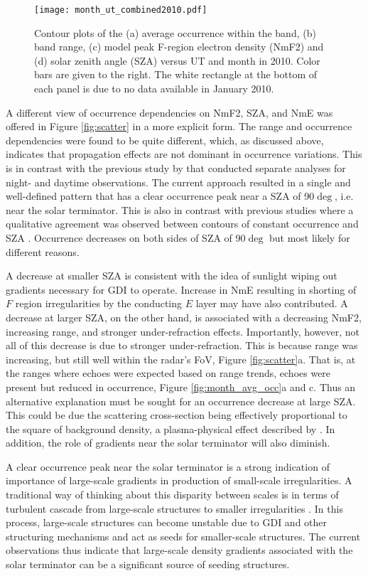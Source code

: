 \begin{figure}
\texttt{[image: month\_ut\_combined2010.pdf]}
\caption{Contour plots of the (a) average occurrence within the band, (b) band range, (c) model peak F-region electron density (NmF2) and (d) solar zenith angle (SZA) versus UT and month in 2010. Color bars are given to the right. The white rectangle at the bottom of each panel is due to no data available in January 2010.}
\label{fig:month_ut}
\end{figure}

A different view of occurrence dependencies on NmF2, SZA, and NmE was offered in Figure \ref{fig:scatter} in a more explicit form. The range and occurrence dependencies were found to be quite different, which, as discussed above, indicates that propagation effects are not dominant in occurrence variations. This is in contrast with the previous study by \citet{Kane2012} that conducted separate analyses for night- and daytime observations. The current approach resulted in a single and well-defined pattern that has a clear occurrence peak near a SZA of 90\(\deg\), i.e. near the solar terminator. This is also in contrast with previous studies where a qualitative agreement was observed between contours of constant occurrence and SZA \citep{Kane12,Ghezelbesh2014b}. Occurrence decreases on both sides of SZA of 90\(\deg\) but most likely for different reasons.

A decrease at smaller SZA is consistent with the idea of sunlight wiping out gradients necessary for GDI to operate. Increase in NmE resulting in shorting of \(F\) region irregularities by the conducting \(E\) layer may have also contributed. A decrease at larger SZA, on the other hand, is associated with a decreasing NmF2, increasing range, and stronger under-refraction effects. Importantly, however, not all of this decrease is due to stronger under-refraction. This is because range was increasing, but still well within the radar's FoV, Figure \ref{fig:scatter}a. That is, at the ranges where echoes were expected based on range trends, echoes were present but reduced in occurrence, Figure \ref{fig:month_avg_occ}a and c. Thus an alternative explanation must be sought for an occurrence decrease at large SZA. This could be due the scattering cross-section being effectively proportional to the square of background density, a plasma-physical effect described by \citet{Makarevich2014b}. In addition, the role of gradients near the solar terminator will also diminish.

A clear occurrence peak near the solar terminator is a strong indication of importance of large-scale gradients in production of small-scale irregularities. A traditional way of thinking about this disparity between scales is in terms of turbulent cascade from large-scale structures to smaller irregularities \citep{Tsunoda1988}. In this process, large-scale structures can become unstable due to GDI and other structuring mechanisms and act as seeds for smaller-scale structures. The current observations thus indicate that large-scale density gradients associated with the solar terminator can be a significant source of seeding structures.

